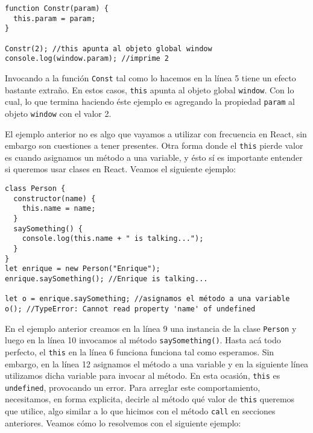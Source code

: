 \documentclass[a4paper, oneside, titlepage, 12pt]{paper}
\begin{document}
\begin{verbatim}
function Constr(param) {
  this.param = param;
}

Constr(2); //this apunta al objeto global window
console.log(window.param); //imprime 2
\end{verbatim}

Invocando a la función \texttt{Const} tal como lo hacemos en la línea 5 tiene un efecto bastante extraño. En estos casos, \texttt{this} apunta al objeto global \texttt{window}. Con lo cual, lo que termina haciendo éste ejemplo es agregando la propiedad \texttt{param} al objeto \texttt{window} con el valor 2.
\newline

El ejemplo anterior no es algo que vayamos a utilizar con frecuencia en React, sin embargo son cuestiones a tener presentes. Otra forma donde el \texttt{this} pierde valor es cuando asignamos un método a una variable, y ésto sí es importante entender si queremos usar clases en React. Veamos el siguiente ejemplo:

\begin{verbatim}
class Person {
  constructor(name) {
    this.name = name;
  }
  saySomething() {
    console.log(this.name + " is talking...");
  }
}
let enrique = new Person("Enrique");
enrique.saySomething(); //Enrique is talking...

let o = enrique.saySomething; //asignamos el método a una variable
o(); //TypeError: Cannot read property 'name' of undefined
\end{verbatim}

En el ejemplo anterior creamos en la línea 9 una instancia de la clase \texttt{Person} y luego en la línea 10 invocamos al método \texttt{saySomething()}. Hasta acá todo perfecto, el \texttt{this} en la línea 6 funciona funciona tal como esperamos. Sin embargo, en la línea 12 asignamos el método a una variable y en la siguiente línea utilizamos dicha variable para invocar al método. En esta ocasión, \texttt{this} es \texttt{undefined}, provocando un error. Para arreglar este comportamiento, necesitamos, en forma explicita, decirle al método qué valor de \texttt{this} queremos que utilice, algo similar a lo que hicimos con el método \texttt{call} en secciones anteriores. Veamos cómo lo resolvemos con el siguiente ejemplo:
 
\end{document}
